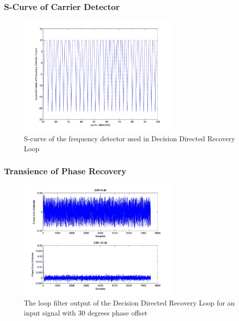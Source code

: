 \documentclass[]{article}
\begin{document}
\subsubsection{S-Curve of Carrier Detector}
\begin{figure}[H]
\centering
\hspace*{-2cm}\includegraphics[width=0.7\textwidth]{qpScurvefo.jpg}
\caption{S-curve of the frequency detector used in Decision Directed Recovery Loop}
\end{figure}

\subsubsection{Transience of Phase Recovery}
\begin{figure}[H]
\centering
\hspace*{-2cm}\includegraphics[width=0.7\textwidth]{qpLoopFilterpo_ddr1.jpg}
\caption{The loop filter output of the Decision Directed Recovery Loop for an input signal with 30 degrees phase offset}
\end{figure}
\end{document}
